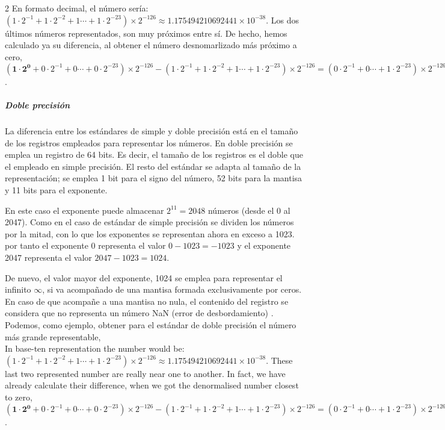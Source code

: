 \begin{paracol}{2}
En formato decimal, el número sería: $(1\cdot2^{-1}+1\cdot2^{-2}+1\cdots+1\cdot2^{-23})\times2^{-126}\approx 1.175494210692441\times10^{-38}$. Los dos últimos números representados, son muy próximos entre sí. De hecho, hemos calculado ya su diferencia, al obtener el número desnomarlizado más próximo a cero, $(\mathbf{1\cdot2^0}+0\cdot2^{-1}+0\cdots+0\cdot2^{-23})\times 2^{-126}-(1\cdot2^{-1}+1\cdot2^{-2}+1\cdots+1\cdot2^{-23})\times2^{-126}=(0\cdot2^{-1}+0\cdots+1\cdot2^{-23})\times 2^{-126}=2^{-149}\approx 1.401298464324817\times10^{-45}$.
  
\subparagraph*{Doble precisión}  La diferencia entre los estándares de simple y doble precisión está en el tamaño de los registros empleados para representar los números. En doble precisión se emplea un registro de 64 bits. Es decir, el tamaño de los registros es el doble que el empleado en simple precisión. El resto del estándar se adapta al tamaño de la representación; se emplea 1 bit para el signo del número, 52 bits para la mantisa y 11 bits para el exponente.

En este caso el exponente puede almacenar $2^{11}=2048$ números (desde el 0 al 2047). Como en el caso de estándar de simple precisión se dividen los números por la mitad, con lo que los exponentes se representan ahora en exceso a 1023. por tanto el exponente 0 representa el valor $0-1023=-1023$ y el exponente 2047 representa el valor $2047-1023=1024$.

De nuevo, el valor mayor del exponente, 1024 se emplea para representar el infinito $\infty$, si va acompañado de una mantisa formada exclusivamente por ceros. En caso de que acompañe a una mantisa no nula, el contenido del registro se considera que no representa un número NaN (error de desbordamiento) . Podemos, como ejemplo, obtener para el estándar de doble precisión el número más grande representable,\\

\switchcolumn
In base-ten representation the number wo\-uld be: $(1\cdot2^{-1}+1\cdot2^{-2}+1\cdots+1\cdot2^{-23})\times2^{-126}\approx 1.175494210692441\times10^{-38}$. These last two represented number are really near one to another. In fact, we have already calculate their difference, when we got the denormalised  number closest to zero, $(\mathbf{1\cdot2^0}+0\cdot2^{-1}+0\cdots+0\cdot2^{-23})\times 2^{-126}-(1\cdot2^{-1}+1\cdot2^{-2}+1\cdots+1\cdot2^{-23})\times2^{-126}=(0\cdot2^{-1}+0\cdots+1\cdot2^{-23})\times 2^{-126}=2^{-149}\approx 1.401298464324817\times10^{-45}$.


\end{paracol}
